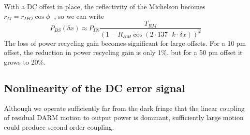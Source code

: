 With a DC offset in place, the reflectivity of the Michelson becomes $r_M = r_{IFO}\cos\phi_-$, so we can write
\begin{equation}
P_{BS}(\delta x) \approx P_{IN} 
\frac{T_{RM}}{\left(1 - R_{RM} \cos\left(2\cdot137\cdot k\cdot\delta x\right)\right)^2}
\end{equation}
The loss of power recycling gain becomes significant for large
offsets.  For a 10 pm offset, the reduction in power recycling gain is
only 1\%, but for a 50 pm offset it grows to 20\%.

\subsection{Nonlinearity of the DC error signal}

Although we operate sufficiently far from the dark fringe that the
linear coupling of residual DARM motion to output power is dominant,
sufficiently large motion could produce second-order coupling. 


